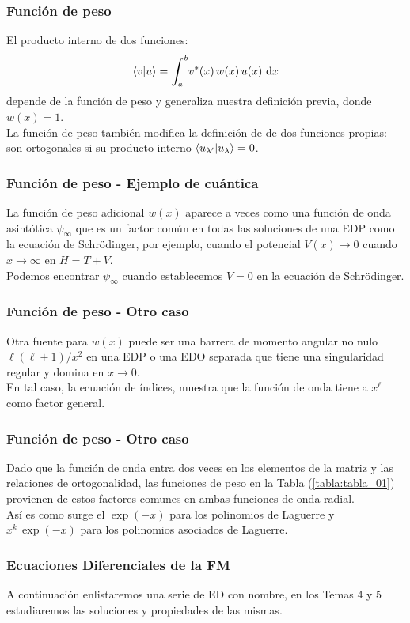 \documentclass[12pt]{beamer}
\begin{document}
\begin{frame}
\frametitle{Función de peso}
El producto interno de dos funciones:
\pause
\begin{align*}
\ip{v}{u} = \scaleint{6ex}_{\bs a}^{b} v^{*} (x) \, w (x) \, u (x) \, \dd{x}
\end{align*}
depende de la función de peso y generaliza nuestra definición previa, donde $w (x) = 1$.
\\
\bigskip
\pause
La función de peso también modifica la definición de  de dos funciones propias: \pause son ortogonales si su producto interno $\ip{u_{\pderivada{\lambda}}}{u_{\lambda}} = 0$.
\end{frame}
\begin{frame}
\frametitle{Función de peso - Ejemplo de cuántica}
La función de peso adicional $w(x)$ aparece a veces como una función de onda asintótica $\psi_{\infty}$ que es un factor común en todas las soluciones de una EDP como la ecuación de Schrödinger, \pause por ejemplo, cuando el potencial $V (x) \to 0$ cuando $x \to \infty$ en $H = T + V$. 
\\
\bigskip
\pause
Podemos encontrar $\psi_{\infty}$ cuando establecemos $V = 0$ en la ecuación de Schrödinger.
\end{frame}
\begin{frame}
\frametitle{Función de peso - Otro caso}
Otra fuente para $w (x)$ puede ser una barrera de momento angular no nulo $\ell (\ell +1)/x^{2}$ en una EDP o una EDO separada que tiene una singularidad regular y domina en $x \to 0$. 
\\
\bigskip
\pause
En tal caso, la ecuación de índices, muestra que la función de onda tiene a $x^{\ell}$ como factor general.
\end{frame}
\begin{frame}
\frametitle{Función de peso - Otro caso}
Dado que la función de onda entra dos veces en los elementos de la matriz y las relaciones de ortogonalidad, las funciones de peso en la Tabla (\ref{tabla:tabla_01}) provienen de estos factores comunes en ambas funciones de onda radial.
\\
\bigskip
\pause
Así es como surge el $\exp(-x)$ para los polinomios de Laguerre y $x^{k} \, \exp(-x)$ para los polinomios asociados de Laguerre.
\end{frame}
\begin{frame}
\frametitle{Ecuaciones Diferenciales de la FM}
A continuación enlistaremos una serie de ED con nombre, \pause en los Temas 4 y 5 estudiaremos las soluciones y propiedades de las mismas.
\end{frame}
\end{document}
